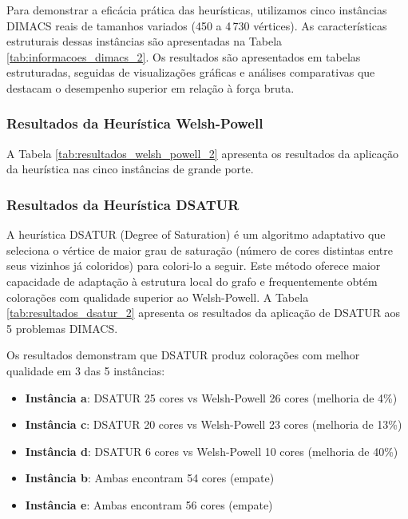 \documentclass[12pt]{article}
\begin{document}
Para demonstrar a eficácia prática das heurísticas, utilizamos cinco instâncias DIMACS reais de tamanhos variados (450 a 4\,730 vértices). As características estruturais dessas instâncias são apresentadas na Tabela \ref{tab:informacoes_dimacs_2}. Os resultados são apresentados em tabelas estruturadas, seguidas de visualizações gráficas e análises comparativas que destacam o desempenho superior em relação à força bruta.



\subsubsection{Resultados da Heurística Welsh-Powell}

A Tabela \ref{tab:resultados_welsh_powell_2} apresenta os resultados da aplicação da heurística nas cinco instâncias de grande porte.



\subsubsection{Resultados da Heurística DSATUR}

A heurística DSATUR (Degree of Saturation) é um algoritmo adaptativo que seleciona o vértice de maior grau de saturação (número de cores distintas entre seus vizinhos já coloridos) para colori-lo a seguir. Este método oferece maior capacidade de adaptação à estrutura local do grafo e frequentemente obtém colorações com qualidade superior ao Welsh-Powell. A Tabela \ref{tab:resultados_dsatur_2} apresenta os resultados da aplicação de DSATUR aos 5 problemas DIMACS.

Os resultados demonstram que DSATUR produz colorações com melhor qualidade em 3 das 5 instâncias:

\begin{itemize}
    \item \textbf{Instância a}: DSATUR 25 cores vs Welsh-Powell 26 cores (melhoria de 4\%)
    \item \textbf{Instância c}: DSATUR 20 cores vs Welsh-Powell 23 cores (melhoria de 13\%)
    \item \textbf{Instância d}: DSATUR 6 cores vs Welsh-Powell 10 cores (melhoria de 40\%)
    \item \textbf{Instância b}: Ambas encontram 54 cores (empate)
    \item \textbf{Instância e}: Ambas encontram 56 cores (empate)
\end{itemize}
\end{document}
